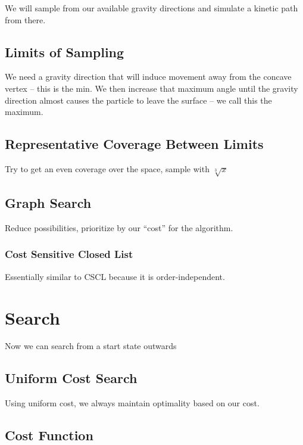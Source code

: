 We will sample from our available gravity directions and simulate a kinetic path from there.


	\subsection{Limits of Sampling}

We need a gravity direction that will induce movement away from the concave vertex -- this is the min. We then increase that maximum angle until the gravity direction almost causes the particle to leave the surface -- we call this the maximum.

	\subsection{Representative Coverage Between Limits}

Try to get an even coverage over the space, sample with $\sqrt[3]{x}$


	\subsection{Graph Search}

Reduce possibilities, prioritize by our ``cost'' for the algorithm.

		\subsubsection{Cost Sensitive Closed List}

Essentially similar to CSCL because it is order-independent.

\section{Search}

Now we can search from a start state outwards

	\subsection{Uniform Cost Search}

Using uniform cost, we always maintain optimality based on our cost.

	\subsection{Cost Function}

